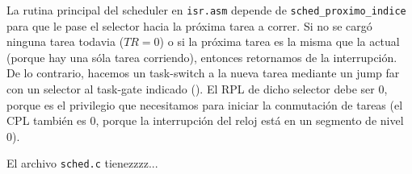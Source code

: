 \documentclass{article}
\begin{document}
	La rutina principal del scheduler en \texttt{isr.asm} depende de \texttt{sched\_proximo\_indice} para que le pase el selector hacia la próxima tarea a correr. Si no se cargó ninguna tarea todavia ($TR = 0$) o si la próxima tarea es la misma que la actual (porque hay una sóla tarea corriendo), entonces retornamos de la interrupción. De lo contrario, hacemos un task-switch a la nueva tarea mediante un jump far con un selector al task-gate indicado (). El RPL de dicho selector debe ser 0, porque es el privilegio que necesitamos para iniciar la conmutación de tareas (el CPL también es 0, porque la interrupción del reloj está en un segmento de nivel 0).
		
	El archivo \texttt{sched.c} tienezzzz...
			
	
\end{document}
